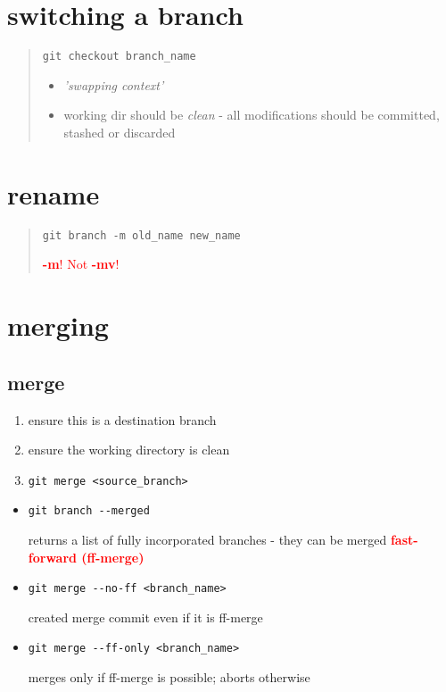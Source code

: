 \documentclass{report}
\begin{document}
\section{switching a branch}
\begin{quote}
\begin{verbatim}
git checkout branch_name
\end{verbatim}
\begin{itemize}
\item \textit{'swapping context'}
\item working dir should be \textit{clean} - all modifications should be committed, stashed or discarded
\end{itemize}
\end{quote}


\section{rename}
\begin{quote}
\begin{verbatim}
git branch -m old_name new_name
\end{verbatim}
\textcolor{red}{\textbf{-m}! Not \textbf{-mv}!}
\end{quote}


\section{merging}

\subsection{merge}

\begin{enumerate}
\item ensure this is a destination branch
\item ensure the working directory is clean
\item \begin{verbatim}
git merge <source_branch>
\end{verbatim}
\end{enumerate}

\begin{itemize}
\item 
\begin{verbatim}
git branch --merged
\end{verbatim}
returns a list of fully incorporated branches - they can be merged \textcolor{red}{\textbf{fast-forward (ff-merge)}}

\item \begin{verbatim}
git merge --no-ff <branch_name>
\end{verbatim}
created merge commit even if it is ff-merge

\item \begin{verbatim}
git merge --ff-only <branch_name>
\end{verbatim}
merges only if ff-merge is possible; aborts otherwise

\end{itemize}
\end{document}
